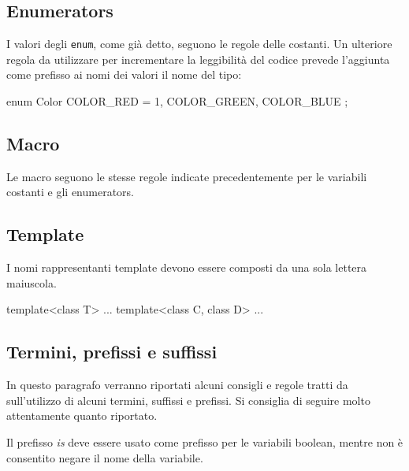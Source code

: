 \subsection{Enumerators}\label{ssec:enumname}

I valori degli \texttt{enum}, come già detto, seguono le regole delle costanti.
Un ulteriore regola da utilizzare per incrementare la leggibilità del codice prevede l'aggiunta come prefisso ai nomi dei valori il nome del tipo:

\begin{minipage}[t]{\rbwidth}
\begin{RightCode}
enum Color
{
	COLOR_RED = 1,
	COLOR_GREEN,
	COLOR_BLUE
};
\end{RightCode}
\end{minipage}

\subsection{Macro}\label{ssec:macroname}

Le macro seguono le stesse regole indicate precedentemente per le variabili costanti e gli enumerators.

\subsection{Template}\label{ssec:templatename}

I nomi rappresentanti template devono essere composti da una sola lettera maiuscola.

\begin{minipage}[t]{\rbwidth}
\begin{RightCode}
template<class T> ...
template<class C, class D> ...
\end{RightCode}
\end{minipage}

\subsection{Termini, prefissi e suffissi}\label{ssec:prefixsuffix}

In questo paragrafo verranno riportati alcuni consigli e regole tratti da \cite{codestyle:geotechnical} sull'utilizzo di alcuni termini, suffissi e prefissi.
Si consiglia di seguire molto attentamente quanto riportato.%

Il prefisso \emph{is} deve essere usato come prefisso per le variabili boolean, mentre non è consentito negare il nome della variabile.


